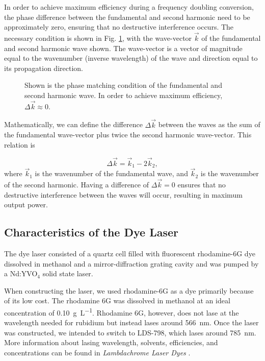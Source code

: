 In order to achieve maximum efficiency during a frequency doubling conversion, the phase difference between the fundamental and second harmonic need to be approximately zero, ensuring that no destructive interference occurs. The necessary condition is shown in Fig. \ref{fig:phasematching}, with the wave-vector $\vec{k}$ of the fundamental and second harmonic wave shown. The wave-vector is a vector of magnitude equal to the wavenumber (inverse wavelength) of the wave and direction equal to its propagation direction.



\begin{figure}[h]
  \centering
  
  \caption{Shown is the phase matching condition of the fundamental and second harmonic wave. In order to achieve maximum efficiency, $\Delta \vec k \approx 0$.}
  \label{fig:phasematching}
\end{figure}

Mathematically, we can define the difference $\Delta \vec k$ between the waves as the sum of the fundamental wave-vector plus twice the second harmonic wave-vector. This relation is

\begin{equation}
  \Delta \vec k = \vec k_1 - 2 \vec k_2,
  \label{phasematching}
\end{equation}
%
where $\vec k_1$ is the wavenumber of the fundamental wave, and $\vec k_2$ is the wavenumber of the second harmonic. Having a difference of $\Delta \vec k = 0$ ensures that no destructive interference between the waves will occur, resulting in maximum output power.

\subsection{Characteristics of the Dye Laser}

The dye laser consisted of a quartz cell filled with fluorescent rhodamine-6G dye dissolved in methanol and a mirror-diffraction grating cavity and was pumped by a Nd:YVO$_4$ solid state laser.

When constructing the laser, we used rhodamine-6G as a dye primarily because of its low cost. The rhodamine 6G was dissolved in methanol at an ideal concentration of \SI{0.10}{\gram \per \liter}. Rhodamine 6G, however, does not lase at the wavelength needed for rubidium but instead lases around \SI{566}{\nano \meter}. Once the laser was constructed, we intended to switch to LDS-798, which lases around \SI{785}{\nano \meter}. More information about lasing wavelength, solvents, efficiencies, and concentrations can be found in \textit{Lambdachrome Laser Dyes} \cite{Brackmann2000}.

